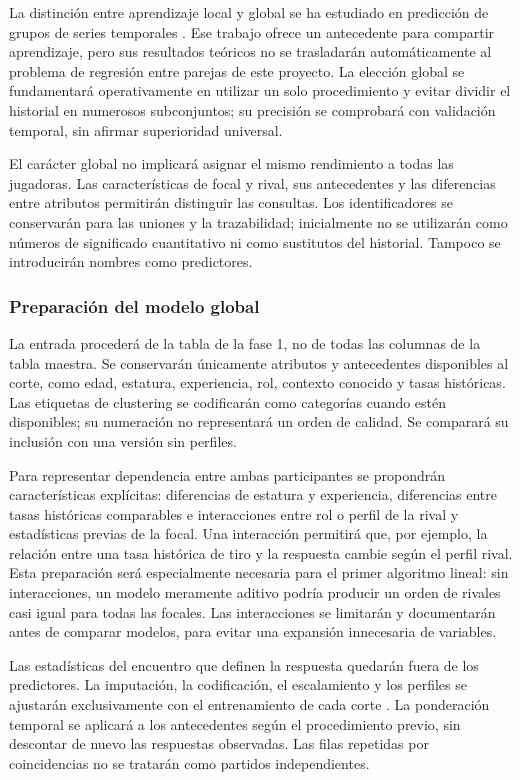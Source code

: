 La distinción entre aprendizaje local y global se ha estudiado en predicción de grupos de series temporales \cite{montero2021global616}. Ese trabajo ofrece un antecedente para compartir aprendizaje, pero sus resultados teóricos no se trasladarán automáticamente al problema de regresión entre parejas de este proyecto. La elección global se fundamentará operativamente en utilizar un solo procedimiento y evitar dividir el historial en numerosos subconjuntos; su precisión se comprobará con validación temporal, sin afirmar superioridad universal.

El carácter global no implicará asignar el mismo rendimiento a todas las jugadoras. Las características de focal y rival, sus antecedentes y las diferencias entre atributos permitirán distinguir las consultas. Los identificadores se conservarán para las uniones y la trazabilidad; inicialmente no se utilizarán como números de significado cuantitativo ni como sustitutos del historial. Tampoco se introducirán nombres como predictores.

\subsubsection*{Preparación del modelo global}
La entrada procederá de la tabla de la fase 1, no de todas las columnas de la tabla maestra. Se conservarán únicamente atributos y antecedentes disponibles al corte, como edad, estatura, experiencia, rol, contexto conocido y tasas históricas. Las etiquetas de clustering se codificarán como categorías cuando estén disponibles; su numeración no representará un orden de calidad. Se comparará su inclusión con una versión sin perfiles.

Para representar dependencia entre ambas participantes se propondrán características explícitas: diferencias de estatura y experiencia, diferencias entre tasas históricas comparables e interacciones entre rol o perfil de la rival y estadísticas previas de la focal. Una interacción permitirá que, por ejemplo, la relación entre una tasa histórica de tiro y la respuesta cambie según el perfil rival. Esta preparación será especialmente necesaria para el primer algoritmo lineal: sin interacciones, un modelo meramente aditivo podría producir un orden de rivales casi igual para todas las focales. Las interacciones se limitarán y documentarán antes de comparar modelos, para evitar una expansión innecesaria de variables.

Las estadísticas del encuentro que definen la respuesta quedarán fuera de los predictores. La imputación, la codificación, el escalamiento y los perfiles se ajustarán exclusivamente con el entrenamiento de cada corte \cite{sklearnCommonPitfallsPonderacion}. La ponderación temporal se aplicará a los antecedentes según el procedimiento previo, sin descontar de nuevo las respuestas observadas. Las filas repetidas por coincidencias no se tratarán como partidos independientes.

